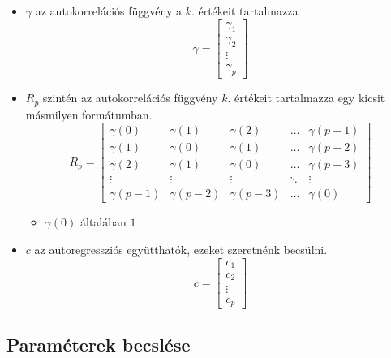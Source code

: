 \documentclass[11pt,a4paper]{article}
\begin{document}
						\begin{itemize}
						\item $\gamma$ az autokorrelációs függvény a $k.$ értékeit tartalmazza
							$$\gamma = \left[ \begin{array}{c}
							\gamma_1 \\ \gamma_2 \\ \vdots \\ \gamma_p
							\end{array}\right]$$
						\item $R_p$ szintén az autokorrelációs függvény $k.$ értékeit tartalmazza egy kicsit másmilyen formátumban.
							$$R_p = \left[\begin{array}{cccccc}
							\gamma(0) & \gamma(1) & \gamma(2) & \dots & \gamma(p-1) \\
							\gamma(1) & \gamma(0) & \gamma(1) & \dots & \gamma(p-2) \\
							\gamma(2) & \gamma(1) & \gamma(0) & \dots & \gamma(p-3) \\
							\vdots & \vdots & \vdots & \ddots & \vdots \\
							\gamma(p-1) & \gamma(p-2) & \gamma(p-3) & \dots & \gamma(0)
							\end{array}\right]$$
						\begin{itemize}
							\item $\gamma(0)$ általában $1$
						\end{itemize}
						\item $c$ az autoregressziós együtthatók, ezeket szeretnénk becsülni.
							$$c = \left[\begin{array}{c}
							c_1 \\ c_2 \\ \vdots \\ c_p
							\end{array}\right]$$
						\end{itemize}
				\subsection{Paraméterek becslése}
\end{document}
